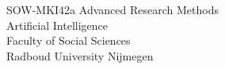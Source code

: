 \begin{titlepage}
\begin{center}
\vfill

SOW-MKI42a Advanced Research Methods\\
Artificial Intelligence\\
Faculty of Social Sciences\\
Radboud University Nijmegen\\
\vspace{0.2cm}
\date{\large\today} %

\end{center}
\end{titlepage}